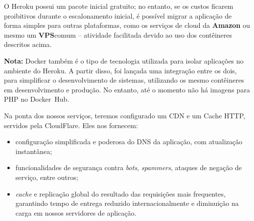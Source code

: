 \documentclass[12pt,a4paper,twoside,hyphens,english,brazil]{abntex2}
\begin{document}
{O Heroku possui um pacote inicial gratuito; no entanto, se os custos ficarem proibitivos durante o escalonamento inicial, é possível migrar a aplicação de forma simples para outras plataformas, como os serviços de cloud da \textbf{Amazon} ou mesmo um \textbf{VPS}\footnotemark comum -- atividade facilitada devido ao uso dos contêineres descritos acima.


\begin{minipage}{\linewidth} 
	\begin{framed}
		\textbf{Nota:} Docker também é o tipo de tecnologia utilizada para isolar aplicações no ambiente do Heroku. A partir disso, foi lançada uma integração entre os dois, para simplificar o desenvolvimento de sistemas, utilizando os mesmo contêineres em desenvolvimento e produção.\cite{heroku-docker} No entanto, até o momento não há imagens para PHP no Docker~Hub\cite{heroku-dockerhub}\cite{heroku-docker-php}.
		
	\end{framed}
\end{minipage}

\vspace{0.5cm}
Na ponta dos nossos serviços, teremos configurado um CDN e um Cache HTTP, servidos pela CloudFlare. Eles nos fornecem:
\begin{itemize}
	\item configuração simplificada e poderosa do DNS da aplicação, com atualização instantânea;
	\item funcionalidades de segurança contra \emph{bots}, \emph{spammers}, ataques de negação de serviço, entre outros;
	\item \emph{cache} e replicação global do resultado das requisições mais frequentes, garantindo tempo de entrega reduzido internacionalmente e diminuição na carga em nossos servidores de aplicação.
\end{itemize}

}
\end{document}

